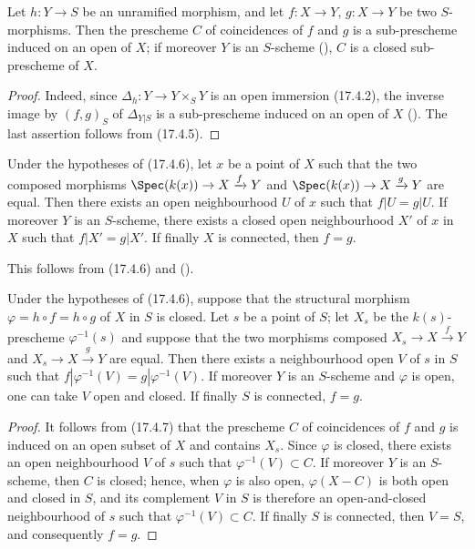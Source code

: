 \begin{proposition}[17.4.6]
\label{IV.17.4.6}
Let $h:Y\to S$ be an unramified morphism, and let $f:X\to Y$, $g:X\to Y$ be two $S$-morphisms.
Then the prescheme $C$ of coincidences of $f$ and $g$ is a sub-prescheme induced on an open of $X$; if moreover $Y$ is an $S$-scheme (), $C$ is a closed sub-prescheme of $X$.
\end{proposition}

\begin{proof}
Indeed, since $\Delta_h:Y\to Y\times_S Y$ is an open immersion (17.4.2), the inverse image by $(f,g)_S$ of $\Delta_{Y|S}$ is a sub-prescheme induced on an open of $X$ ().
The last assertion follows from (17.4.5).
\end{proof}

\begin{corollary}[17.4.7]
\label{IV.17.4.7}
Under the hypotheses of (17.4.6), let $x$ be a point of $X$ such that the two composed morphisms $\Spec(k(x))\to X\xrightarrow{f} Y$ and $\Spec(k(x))\to X\xrightarrow{g} Y$ are equal.
Then there exists an open neighbourhood $U$ of $x$ such that $f|U=g|U$.
If moreover $Y$ is an $S$-scheme, there exists a closed open neighbourhood $X'$ of $x$ in $X$ such that $f|X'=g|X'$.
If finally $X$ is connected, then $f=g$.
\end{corollary}

This follows from (17.4.6) and ().

\begin{corollary}[17.4.8]
\label{IV.17.4.8}
Under the hypotheses of (17.4.6), suppose that the structural morphism $\varphi=h\circ f=h\circ g$ of $X$ in $S$ is closed.
Let $s$ be a point of $S$; let $X_s$ be the $k(s)$-prescheme $\varphi^{-1}(s)$ and suppose that the two morphisms composed $X_s\to X\xrightarrow{f} Y$ and $X_s\to X\xrightarrow{g} Y$ are equal.
Then there exists a neighbourhood open $V$ of $s$ in $S$ such that $f|\varphi^{-1}(V)=g|\varphi^{-1}(V)$.
If moreover $Y$ is an $S$-scheme and $\varphi$ is open, one can take $V$ open and closed.
If finally $S$ is connected, $f=g$.
\end{corollary}

\begin{proof}
It follows from (17.4.7) that the prescheme $C$ of coincidences of $f$ and $g$ is induced on an open subset of $X$ and contains $X_s$.
Since $\varphi$ is closed, there exists an open neighbourhood $V$ of $s$ such that $\varphi^{-1}(V)\subset C$.
If moreover $Y$ is an $S$-scheme, then $C$ is closed; hence, when $\varphi$ is also open, $\varphi(X-C)$ is both open and closed in $S$, and its complement $V$ in $S$ is therefore an open-and-closed neighbourhood of $s$ such that $\varphi^{-1}(V)\subset C$.
If finally $S$ is connected, then $V=S$, and consequently $f=g$.
\end{proof}

